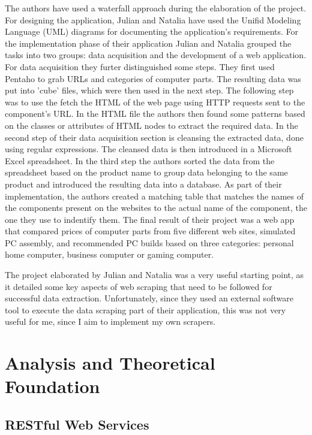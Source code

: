 \documentclass[12pt,a4paper,twoside]{report}
\begin{document}
The authors have used a waterfall approach during the elaboration of the project. For designing the application, Julian and Natalia have used the Unifid Modeling Language (UML) diagrams for documenting the application's requirements. For the implementation phase of their application Julian and Natalia grouped the tasks into two groups: data acquisition and the development of a web application. For data acquisition they furter distinguished some steps. They first used Pentaho to grab URLs and categories of computer parts. The resulting data was put into 'cube' files, which were then used in the next step. The following step was to use the fetch the HTML of the web page using HTTP requests sent to the component's URL. In the HTML file the authors then found some patterns based on the classes or attributes of HTML nodes to extract the required data. In the second step of their data acquisition section is cleansing the extracted data, done using regular expressions. The cleansed data is then introduced in a Microsoft Excel spreadsheet. In the third step the authors sorted the data from the spreadsheet based on the product name to group data belonging to the same product and introduced the resulting data into a database. As part of their implementation, the authors created a matching table that matches the names of the components present on the websites to the actual name of the component, the one they use to indentify them. The final result of their project was a web app that compared prices of computer parts from five different web sites, simulated PC assembly, and recommended PC builds based on three categories: personal home computer, business computer or gaming computer.

The project elaborated by Julian and Natalia was a very useful starting point, as it detailed some key aspects of web scraping that need to be followed for successful data extraction. Unfortunately, since they used an external software tool to execute the data scraping part of their application, this was not very useful for me, since I aim to implement my own scrapers.


\chapter{Analysis and Theoretical Foundation}

\section{RESTful Web Services}
\end{document}
